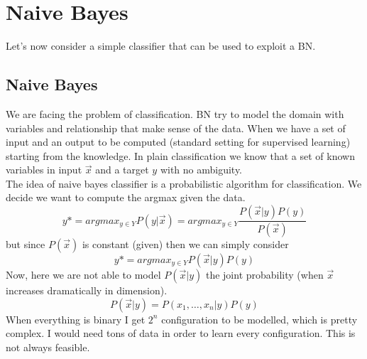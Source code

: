 \chapter{Naive Bayes}
\label{cha:bay_net_lab}

Let's now consider a simple classifier that can be used to exploit a BN.\\

\section{Naive Bayes}
We are facing the problem of classification. BN try to model the domain with
variables and relationship that make sense of the data. When we have a set of input
and an output to be computed (standard setting for supervised learning) starting
from the knowledge. In plain classification we know that a set of known
variables in input $\Vec{x}$ and a target $y$ with no ambiguity.\\ The idea of
naive bayes classifier is a probabilistic algorithm for classification. We decide
we want to compute the argmax given the data.
\[
	y* = argmax_{y \in Y}P(y|\Vec{x}) = argmax_{y \in Y}\frac{P(\Vec{x}|y)P(y)}{P(\Vec{x})}
\]
but since $P(\Vec{x})$ is constant (given) then we can simply consider
\[
	y* = argmax_{y \in Y}{P(\Vec{x}|y)P(y)}
\]
Now, here we are not able to model $P(\Vec{x}|y)$ the joint probability (when
$\Vec{x}$ increases dramatically in dimension).
\[
	P(\Vec{x}|y) = P(x_{1}, \dots, x_{n}| y) P(y)
\]
When everything is binary I get $2^{n}$ configuration to be modelled, which is pretty
complex. I would need tons of data in order to learn every configuration. This is
not always feasible.\\

